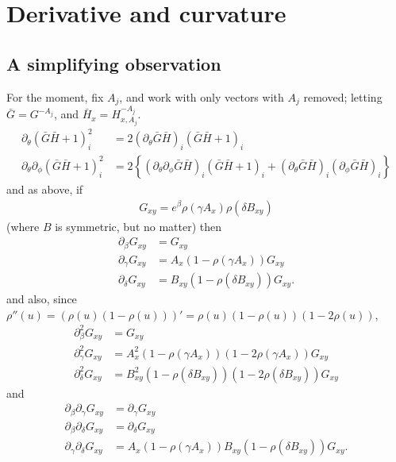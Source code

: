 \documentclass{article}
\begin{document}
\section{Derivative and curvature}

\subsection{A simplifying observation}

For the moment, fix $A_j$, and work with only vectors with $A_j$ removed;
letting $\bar G = G^{-A_j}$, and $\bar H_x = H_{x,A_j}^{-A_j}$.
\begin{align}
  \partial_\theta ( \bar G \bar H + 1 )_i^2 &= 2 ( \partial_\theta \bar G \bar H )_i (\bar G \bar H +1)_i \\
  \partial_\theta \partial_\phi ( \bar G \bar H + 1 )_i^2 
    &= 2 \left\{ ( \partial_\theta \partial_\phi \bar G \bar H )_i (\bar G \bar H +1)_i 
      + ( \partial_\theta \bar G \bar H )_i ( \partial_\phi \bar G \bar H )_i \right\}
\end{align}
and as above, if
\begin{align}
  G_{xy} = e^\beta \rho(\gamma A_x) \rho(\delta B_{xy})
\end{align}
(where $B$ is symmetric, but no matter)
then
\begin{align}
  \partial_\beta G_{xy} &= G_{xy} \\
  \partial_\gamma G_{xy} &= A_x (1-\rho(\gamma A_x)) G_{xy} \\
  \partial_\delta G_{xy} &= B_{xy} (1-\rho(\delta B_{xy})) G_{xy}  .
\end{align}
and also, since $\rho''(u) = (\rho(u)(1-\rho(u)))' = \rho(u)(1-\rho(u))(1-2\rho(u))$,
\begin{align}
  \partial_\beta^2 G_{xy} &= G_{xy} \\
  \partial_\gamma^2 G_{xy}  &= A_x^2 (1-\rho(\gamma A_x)) (1-2\rho(\gamma A_x)) G_{xy} \\
  \partial_\delta^2 G_{xy} &= B_{xy}^2 (1-\rho(\delta B_{xy})) (1-2\rho(\delta B_{xy})) G_{xy} 
\end{align}
and
\begin{align}
  \partial_\beta \partial_\gamma G_{xy} &= \partial_\gamma G_{xy} \\
  \partial_\beta \partial_\delta G_{xy} &= \partial_\delta G_{xy} \\
  \partial_\gamma \partial_\delta G_{xy} &= A_x (1-\rho(\gamma A_x)) B_{xy} (1-\rho(\delta B_{xy})) G_{xy}  .
\end{align}
\end{document}
